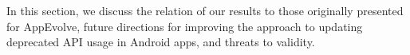 In this section, we discuss the relation of our
results to those originally presented for AppEvolve, future directions for improving the
approach to updating deprecated API usage in Android apps, and threats to validity.

%
%
%
%
%
%
%
%
